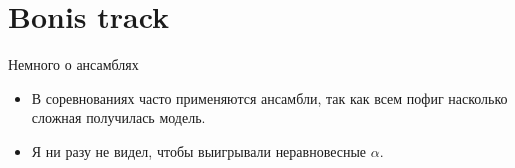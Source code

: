 \documentclass[14pt, fleqn, xcolor={dvipsnames, table}]{beamer}
\begin{document}
\section{Bonis track}

\begin{frame}{Немного о ансамблях}
\begin{itemize}
  \item В соревнованиях часто применяются ансамбли, так как всем пофиг насколько сложная получилась модель.
  \item Я ни разу не видел, чтобы выигрывали неравновесные $\alpha$.
\end{itemize}
\end{frame} 
\end{document}
